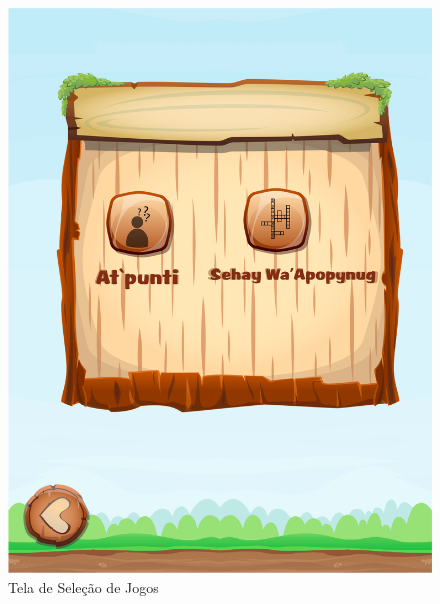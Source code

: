 \documentclass[12pt]{article}
\begin{document}
	\begin{figure}[!htb]
		\centering
		\includegraphics[width=\linewidth]{IMG/selecNivel.png}
		\caption{Tela de Seleção de Jogos}\label{fig:jogos}
		\endminipage \hspace{0.5cm}

\end{figure}
\end{document}
